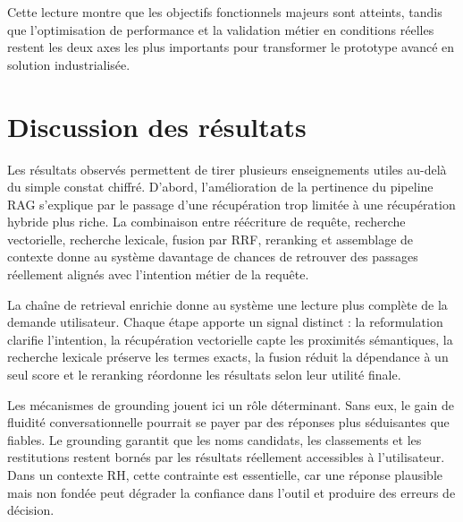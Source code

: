 Cette lecture montre que les objectifs fonctionnels majeurs sont atteints, tandis que l'optimisation de performance et la validation métier en conditions réelles restent les deux axes les plus importants pour transformer le prototype avancé en solution industrialisée.
\section*{Discussion des résultats}
Les résultats observés permettent de tirer plusieurs enseignements utiles au-delà du simple constat chiffré. D'abord, l'amélioration de la pertinence du pipeline RAG s'explique par le passage d'une récupération trop limitée à une récupération hybride plus riche. La combinaison entre réécriture de requête, recherche vectorielle, recherche lexicale, fusion par RRF, reranking et assemblage de contexte donne au système davantage de chances de retrouver des passages réellement alignés avec l'intention métier de la requête.

La chaîne de retrieval enrichie donne au système une lecture plus complète de la demande utilisateur. Chaque étape apporte un signal distinct : la reformulation clarifie l'intention, la récupération vectorielle capte les proximités sémantiques, la recherche lexicale préserve les termes exacts, la fusion réduit la dépendance à un seul score et le reranking réordonne les résultats selon leur utilité finale.

Les mécanismes de grounding jouent ici un rôle déterminant. Sans eux, le gain de fluidité conversationnelle pourrait se payer par des réponses plus séduisantes que fiables. Le grounding garantit que les noms candidats, les classements et les restitutions restent bornés par les résultats réellement accessibles à l'utilisateur. Dans un contexte RH, cette contrainte est essentielle, car une réponse plausible mais non fondée peut dégrader la confiance dans l'outil et produire des erreurs de décision.

